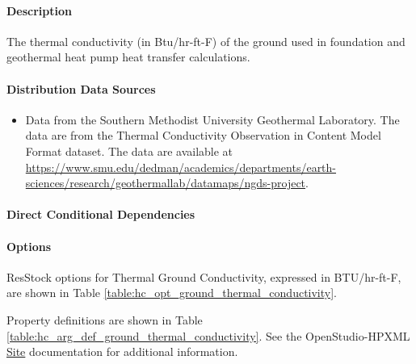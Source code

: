 \paragraph{Description}
% 
The thermal conductivity (in Btu/hr-ft-F) of the ground used in
foundation and geothermal heat pump heat transfer calculations.

\paragraph{Distribution Data Sources}
% 
\begin{itemize}

\item
  Data from the Southern Methodist University Geothermal Laboratory. The data are from the Thermal Conductivity Observation in Content Model Format dataset. The data are available at \url{https://www.smu.edu/dedman/academics/departments/earth-sciences/research/geothermallab/datamaps/ngds-project}.
\end{itemize}

\paragraph{Direct Conditional Dependencies}


\paragraph{Options}
ResStock options for Thermal Ground Conductivity, expressed in BTU/hr-ft-F, are shown in Table \ref{table:hc_opt_ground_thermal_conductivity}.



Property definitions are shown in Table \ref{table:hc_arg_def_ground_thermal_conductivity}. See the OpenStudio-HPXML \href{https://openstudio-hpxml.readthedocs.io/en/v1.10.0/workflow_inputs.html\#hpxml-site}{Site} documentation for additional information.



